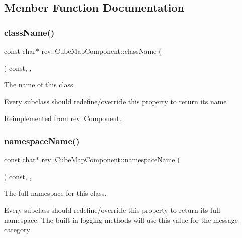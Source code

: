 \subsection{Member Function Documentation}
\mbox{\label{classrev_1_1_cube_map_component_a09be93995cb43696c7f7644a224b59e4}} 
\subsubsection{\texorpdfstring{className()}{className()}}
{\footnotesize\ttfamily const char$\ast$ rev\+::\+Cube\+Map\+Component\+::class\+Name (\begin{DoxyParamCaption}{ }\end{DoxyParamCaption}) const\hspace{0.3cm}{\ttfamily [inline]}, {\ttfamily [override]}, {\ttfamily [virtual]}}



The name of this class. 

Every subclass should redefine/override this property to return its name 

Reimplemented from \mbox{\hyperlink{classrev_1_1_component_a07619152d5acafe7a536df3a6a476349}{rev\+::\+Component}}.

\mbox{\label{classrev_1_1_cube_map_component_a5fd0d5b47d8ba3594d4daf0ed8135b83}} 
\subsubsection{\texorpdfstring{namespaceName()}{namespaceName()}}
{\footnotesize\ttfamily const char$\ast$ rev\+::\+Cube\+Map\+Component\+::namespace\+Name (\begin{DoxyParamCaption}{ }\end{DoxyParamCaption}) const\hspace{0.3cm}{\ttfamily [inline]}, {\ttfamily [override]}, {\ttfamily [virtual]}}



The full namespace for this class. 

Every subclass should redefine/override this property to return its full namespace. The built in logging methods will use this value for the message category 

